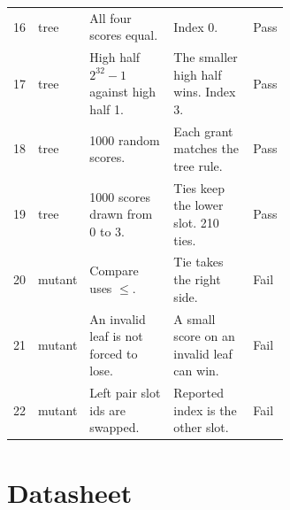 \documentclass[11pt,a4paper]{article}
\begin{document}
\begin{longtable}{@{}clp{0.32\linewidth}p{0.30\linewidth}l@{}}
16 & tree & All four scores equal. & Index 0. & Pass \\
17 & tree & High half $2^{32}-1$ against high half 1. & The smaller high half wins. Index 3. & Pass \\
18 & tree & 1000 random scores. & Each grant matches the tree rule. & Pass \\
19 & tree & 1000 scores drawn from 0 to 3. & Ties keep the lower slot. 210 ties. & Pass \\
20 & mutant & Compare uses $\le$. & Tie takes the right side. & Fail \\
21 & mutant & An invalid leaf is not forced to lose. & A small score on an invalid leaf can win. & Fail \\
22 & mutant & Left pair slot ids are swapped. & Reported index is the other slot. & Fail \\
\bottomrule
\end{longtable}

\section{Datasheet}
\end{document}
